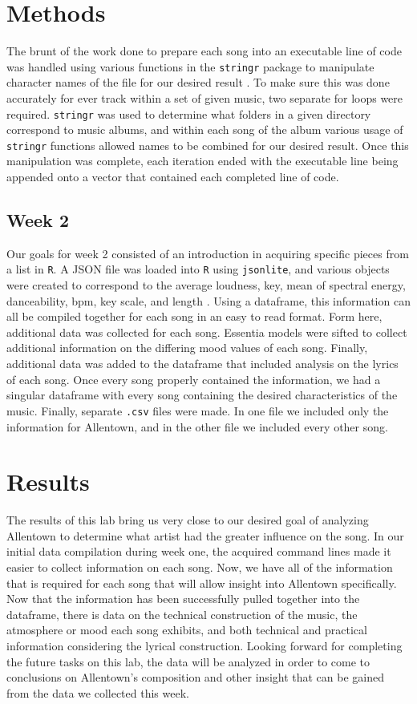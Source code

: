 \documentclass{article}\usepackage[]{graphicx}\usepackage[]{xcolor}
\begin{document}
\begin{multicols}{2}
\section{Methods}
The brunt of the work done to prepare each song into an executable line of code was handled using various functions in the \texttt{stringr} package to manipulate character names of the file for our desired result \citep{stringr}. To make sure this was done accurately for ever track within a set of given music, two separate for loops were required. \texttt{stringr} was used to determine what folders in a given directory correspond to music albums, and within each song of the album various usage of \texttt{stringr} functions allowed names to be combined for our desired result. Once this manipulation was complete, each iteration ended with the executable line being appended onto a vector that contained each completed line of code.

\subsection{Week 2}
Our goals for week 2 consisted of an introduction in acquiring specific pieces from a list in \texttt{R}. A JSON file was loaded into \texttt{R} using \texttt{jsonlite}, and various objects were created to correspond to the average loudness, key, mean of spectral energy, danceability, bpm, key scale, and length \citep{jsonlite}. Using a dataframe, this information can all be compiled together for each song in an easy to read format. Form here, additional data was collected for each song. Essentia models were sifted to collect additional information on the differing mood values of each song. Finally, additional data was added to the dataframe that included analysis on the lyrics of each song. Once every song properly contained the information, we had a singular dataframe with every song containing the desired characteristics of the music. Finally, separate \texttt{.csv} files were made. In one file we included only the information for Allentown, and in the other file we included every other song. 

\section{Results}
The results of this lab bring us very close to our desired goal of analyzing Allentown to determine what artist had the greater influence on the song. In our initial data compilation during week one, the acquired command lines made it easier to collect information on each song. Now, we have all of the information that is required for each song that will allow insight into Allentown specifically. Now that the information has been successfully pulled together into the dataframe, there is data on the technical construction of the music, the atmosphere or mood each song exhibits, and both technical and practical information considering the lyrical construction. Looking forward for completing the future tasks on this lab, the data will be analyzed in order to come to conclusions on Allentown's composition and other insight that can be gained from the data we collected this week.


\end{multicols}
\end{document}
